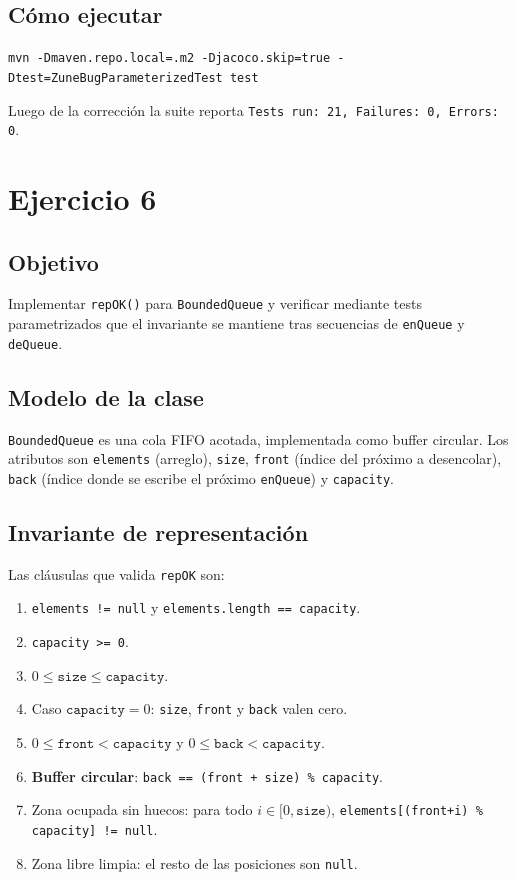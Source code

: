 \documentclass[12pt,a4paper]{article}
\begin{document}
\subsection{Cómo ejecutar}
\begin{center}
\texttt{mvn -Dmaven.repo.local=.m2 -Djacoco.skip=true -Dtest=ZuneBugParameterizedTest test}
\end{center}
Luego de la corrección la suite reporta \texttt{Tests run: 21, Failures: 0, Errors: 0}.

\section{Ejercicio 6}
\subsection{Objetivo}
Implementar \texttt{repOK()} para \texttt{BoundedQueue} y verificar mediante tests parametrizados que el invariante se mantiene tras secuencias de \texttt{enQueue} y \texttt{deQueue}.

\subsection{Modelo de la clase}
\texttt{BoundedQueue} es una cola FIFO acotada, implementada como buffer circular. Los atributos son \texttt{elements} (arreglo), \texttt{size}, \texttt{front} (índice del próximo a desencolar), \texttt{back} (índice donde se escribe el próximo \texttt{enQueue}) y \texttt{capacity}.

\subsection{Invariante de representación}
Las cláusulas que valida \texttt{repOK} son:
\begin{enumerate}
  \item \texttt{elements != null} y \texttt{elements.length == capacity}.
  \item \texttt{capacity >= 0}.
  \item $0 \le \texttt{size} \le \texttt{capacity}$.
  \item Caso $\texttt{capacity} = 0$: \texttt{size}, \texttt{front} y \texttt{back} valen cero.
  \item $0 \le \texttt{front} < \texttt{capacity}$ y $0 \le \texttt{back} < \texttt{capacity}$.
  \item \textbf{Buffer circular}: \texttt{back == (front + size) \% capacity}.
  \item Zona ocupada sin huecos: para todo $i \in [0, \texttt{size})$, \texttt{elements[(front+i) \% capacity] != null}.
  \item Zona libre limpia: el resto de las posiciones son \texttt{null}.
\end{enumerate}
\end{document}
